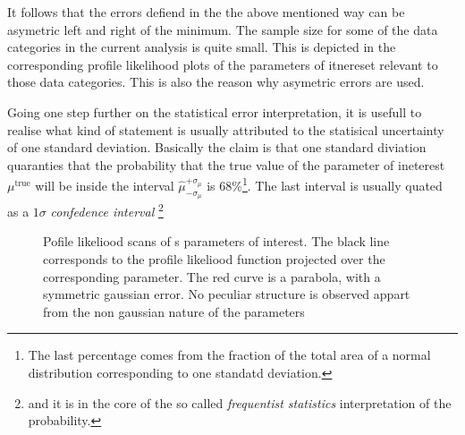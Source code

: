 It follows that the errors defiend in the the above mentioned way can be asymetric left and right of the minimum. 
The sample size for some of the data categories in the current analysis is quite small. This is depicted in the corresponding profile 
likelihood plots of the parameters of itnereset relevant to those data categories. This is also the reason why asymetric errors are used. 

Going one step further on the statistical error interpretation, it is usefull to realise what kind of statement is usually
attributed to the statisical uncertainty of one standard deviation. Basically the claim is that one standard diviation
quaranties that the probability that the true value of the parameter of ineterest $\mu^{\text{true}}$ will be inside the
interval $\hat{\mu}_{-\sigma_\mu}^{+\sigma_\mu}$ is $68\%$\footnote{The last percentage comes from the fraction of the total area of a normal distribution corresponding to one standatd deviation.}.
The last interval is usually quated as a $1\sigma$ {\it confedence interval} \footnote{and it is in the core of the so called {\it frequentist statistics}
interpretation of the probability.}

\begin{figure}[h]
  \centering
  \begin{subfigure}{0.5\textwidth}
    \scalebox{0.60}{}
    \caption{}
    \label{skase}
  \end{subfigure}%
  \hfill%
  \begin{subfigure}{0.5\textwidth}
    \scalebox{0.60}{}
    \caption{}
    \label{opasd}
  \end{subfigure}
  \begin{subfigure}{0.5\textwidth}
    \scalebox{0.60}{}
    \caption{}
    \label{opa}
  \end{subfigure}%
  \hfill%
  \begin{subfigure}{0.5\textwidth}
    \scalebox{0.60}{}
    \caption{}
    \label{opa}
  \end{subfigure}
\caption{Pofile likeliood scans of \Acp{} parameters of interest. The black line corresponds to the profile likeliood
         function projected over the corresponding parameter. The red curve is a parabola, with a symmetric gaussian 
         error. No peculiar structure is observed appart from the non gaussian nature of the parameters}
\end{figure}

